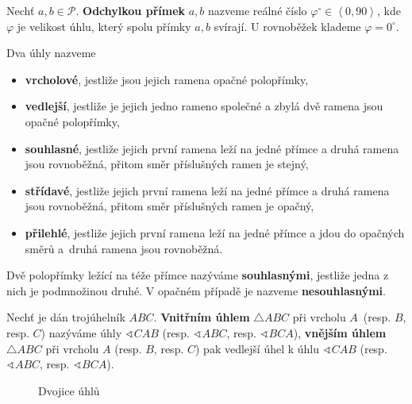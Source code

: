 \begin{definition}
  Nechť $a,b\in \mathscr P.$ \textbf{Odchylkou přímek} $a,b$ nazveme reálné číslo $\varphi^\circ\in \left< 0, 90\right>$, kde $\varphi$ je velikost úhlu, který spolu přímky $a,b$ svírají. U rovnoběžek klademe $\varphi = 0^\circ.$
\end{definition}

\begin{definition}
  Dva úhly nazveme
  \begin{itemize}
    \item \textbf{vrcholové}, jestliže jsou jejich ramena opačné polopřímky,
    \item \textbf{vedlejší}, jestliže je jejich jedno rameno společné a zbylá dvě ramena jsou opačné polopřímky,
    \item \textbf{souhlasné}, jestliže jejich první ramena leží na jedné přímce a druhá ramena jsou rovnoběžná, přitom směr příslušných ramen je stejný,
    \item \textbf{střídavé}, jestliže jejich první ramena leží na jedné přímce a druhá ramena jsou rovnoběžná, přitom směr příslušných ramen je opačný,
    \item \textbf{přilehlé}, jestliže jejich první ramena leží na jedné přímce a jdou do opačných směrů a~druhá ramena jsou rovnoběžná.
  \end{itemize}
\end{definition}

\begin{definition}
  Dvě polopřímky ležící na téže přímce nazýváme \textbf{souhlasnými}, jestliže jedna z nich je podmnožinou druhé. V opačném případě je nazveme \textbf{nesouhlasnými}.
\end{definition}

\begin{definition}
  Nechť je dán trojúhelník $ABC$. \textbf{Vnitřním úhlem} $\triangle ABC$ při vrcholu $A$~(resp. $B$, resp. $C$)
  nazýváme úhly $\sphericalangle CAB$ (resp. $\sphericalangle ABC$, resp. $ \sphericalangle BCA$), \textbf{vnějším úhlem}
  $\triangle ABC$ při vrcholu $A$ (resp. $B$, resp. $C$) pak vedlejší úhel k úhlu $\sphericalangle CAB$ (resp. $\sphericalangle ABC$, resp. $\sphericalangle BCA$).
\end{definition}

\begin{figure}[ht!]
  \centering
  \caption{Dvojice úhlů}
\end{figure}

